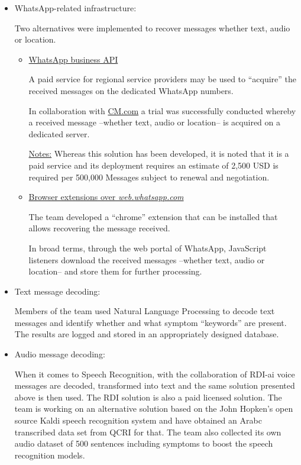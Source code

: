\documentclass[12pt, a4paper]{article}
\begin{document}
\begin{itemize}
\item WhatsApp-related infrastructure:

  Two alternatives were implemented to recover messages whether text,
  audio or location.
  \begin{itemize}
  \item \underline{WhatsApp business API}

    
    A paid service for regional service providers may be used to
    ``acquire'' the received messages on the dedicated WhatsApp numbers.
    
    In collaboration with \url{CM.com} a trial was successfully conducted
    whereby a received message --whether text, audio or location-- is
    acquired on a dedicated server.
    
    \underline{Notes:} Whereas this solution has been developed, it is
    noted that it is a paid service and its deployment requires an
    estimate of 2,500 USD  is required per 500,000 Messages subject to renewal
      and negotiation.
    
  \item \underline{Browser extensions over {\em web.whatsapp.com\/}}
        
    The team developed a ``chrome'' extension that can be installed
    that allows recovering the message received.

    In broad terms, through the web portal of WhatsApp, JavaScript
    listeners download the received messages --whether text, audio or
    location-- and store them for further processing.
      
  \end{itemize}

\item Text message decoding:

  Members of the team 
    used Natural
  Language Processing to decode text messages and identify whether and
  what symptom ``keywords'' are present. The results are logged and
  stored in an appropriately designed database.

\item Audio message decoding:

  When it comes to Speech Recognition, with the collaboration of RDI-ai
  voice messages are decoded, transformed into text and the same
  solution presented above is then used.
  The RDI solution is also a paid licensed solution. 
  The team is working on an alternative solution based on the John  
  Hopken's open source Kaldi speech recognition system and have 
    obtained an Arabc transcribed data set from QCRI for that. 
    The team also collected its own audio dataset of 500 sentences 
    including symptoms to boost the speech recognition models.

\end{itemize}
\end{document}

